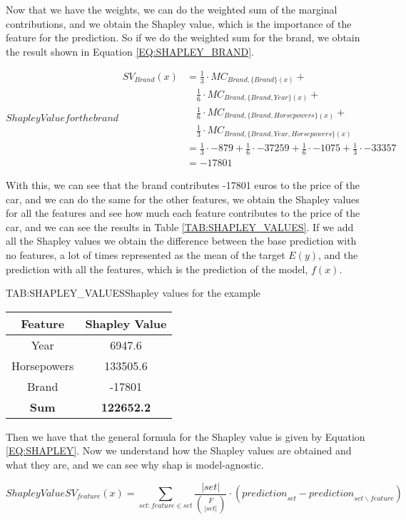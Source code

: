 Now that we have the weights, we can do the weighted sum of the marginal contributions, and we obtain the Shapley value, which is the importance of the feature for the prediction. So if we do the weighted sum for the brand, we obtain the result shown in Equation \ref{EQ:SHAPLEY_BRAND}.

\begin{equation}[EQ:SHAPLEY_BRAND]{Shapley Value for the brand}
    \begin{split}
        SV_{Brand}(x) & = \frac{1}{3} \cdot MC_{Brand, \{Brand\}(x)} + \\ 
        & \quad \frac{1}{6} \cdot MC_{Brand, \{Brand, Year\}(x)} + \\ 
        & \quad \frac{1}{6} \cdot MC_{Brand, \{Brand, Horsepowers\}(x)} + \\ 
        & \quad \frac{1}{3} \cdot MC_{Brand, \{Brand, Year, Horsepowers\}(x)} \\
        & = \frac{1}{3} \cdot -879 + \frac{1}{6} \cdot -37259 + \frac{1}{6} \cdot -1075 + \frac{1}{3} \cdot -33357 \\
        & = -17801
    \end{split}
\end{equation}

With this, we can see that the brand contributes -17801 euros to the price of the car, and we can do the same for the other features, we obtain the Shapley values for all the features and see how much each feature contributes to the price of the car, and we can see the results in Table \ref{TAB:SHAPLEY_VALUES}. If we add all the Shapley values we obtain the difference between the base prediction with no features, a lot of times represented as the mean of the target $E(y)$, and the prediction with all the features, which is the prediction of the model, $f(x)$.
\begin{table}[Shapley Values]{TAB:SHAPLEY_VALUES}{Shapley values for the example}
    \begin{tabular}{|c|c|}
        \hline
        Feature & Shapley Value \\
        \hline
        Year & 6947.6 \\
        Horsepowers & 133505.6 \\
        Brand & -17801 \\
        \hline
        \textbf{Sum} & \textbf{122652.2} \\
        \hline
    \end{tabular}
\end{table}

Then we have that the general formula for the Shapley value is given by Equation \ref{EQ:SHAPLEY}. Now we understand how the Shapley values are obtained and what they are, and we can see why \ac{shap} is model-agnostic.

\begin{equation}[EQ:SHAPLEY]{Shapley Value}
   \boxed{ SV_{feature}(x) = \sum_{{set:feature} \in {set}} \frac{|{set}| }{{F \choose |{set}|}} \cdot ({prediction}_{set} - {prediction}_{{set} \backslash {feature}})}
\end{equation}